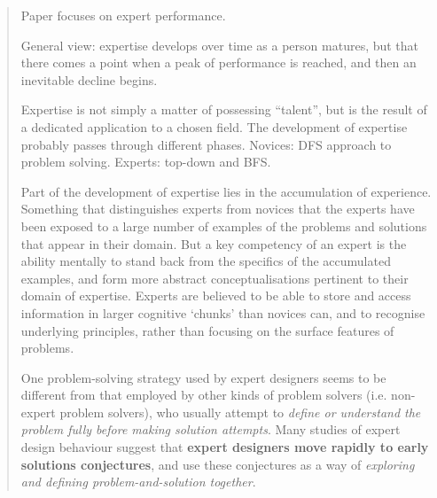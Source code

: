 		\begin{quote}
		\small
		Paper focuses on expert performance. 
		
		General view: expertise develops over time
		as a person matures, but that there comes a point when a peak of performance
		is reached, and then an inevitable decline begins.
		
		
		Expertise is not simply a matter of possessing ``talent'', but is the result
		of a dedicated application to a chosen field.
		The development of expertise probably passes through different phases.
		Novices: DFS approach to problem solving. Experts: top-down and BFS. 
		
% 		
% 		
% 		
% 		
% 		
		
		Part of the development of expertise lies in the accumulation of experience.
		Something that distinguishes experts from novices that the experts have been
		exposed to a large number of examples of the problems and solutions that appear
		in their domain. But a key competency of an expert is the ability mentally to
		stand back from the specifics of the accumulated examples, and form more abstract
		conceptualisations pertinent to their domain of expertise. Experts are believed
		to be able to store and access information in larger cognitive `chunks' than
		novices can, and to recognise underlying principles, rather than focusing on
		the surface features of problems.
		
		One problem-solving strategy used by expert designers seems to be different
		from that employed by other kinds of problem solvers (i.e. non-expert problem solvers), 
		who usually attempt to
		{\em define or understand the problem fully before making solution attempts}.
		Many studies of expert design behaviour suggest that {\bf expert designers move rapidly
		to early solutions conjectures}, and use these conjectures as a way of {\em exploring
		and defining problem-and-solution together}.
		\end{quote}


